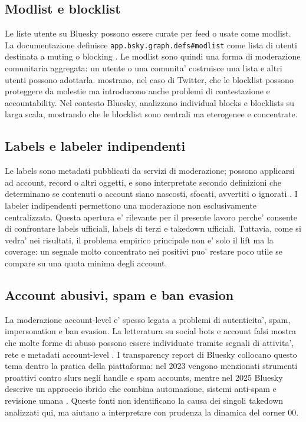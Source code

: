 \subsection{Modlist e blocklist}

Le liste utente su Bluesky possono essere curate per feed o usate come modlist. La documentazione definisce \texttt{app.bsky.graph.defs\#modlist} come lista di utenti destinata a muting o blocking \parencite{blueskyUserLists}. Le modlist sono quindi una forma di moderazione comunitaria aggregata: un utente o una comunita' costruisce una lista e altri utenti possono adottarla. \textcite{jhaver2018blocklists} mostrano, nel caso di Twitter, che le blocklist possono proteggere da molestie ma introducono anche problemi di contestazione e accountability. Nel contesto Bluesky, \textcite{sokoto2026open} analizzano individual blocks e blocklists su larga scala, mostrando che le blocklist sono centrali ma eterogenee e concentrate.

\subsection{Labels e labeler indipendenti}

Le labels sono metadati pubblicati da servizi di moderazione; possono applicarsi ad account, record o altri oggetti, e sono interpretate secondo definizioni che determinano se contenuti o account siano nascosti, sfocati, avvertiti o ignorati \parencite{blueskyLabelsModeration}. I labeler indipendenti permettono una moderazione non esclusivamente centralizzata. Questa apertura e' rilevante per il presente lavoro perche' consente di confrontare labels ufficiali, labels di terzi e takedown ufficiali. Tuttavia, come si vedra' nei risultati, il problema empirico principale non e' solo il lift ma la coverage: un segnale molto concentrato nei positivi puo' restare poco utile se compare su una quota minima degli account.

\subsection{Account abusivi, spam e ban evasion}

La moderazione account-level e' spesso legata a problemi di autenticita', spam, impersonation e ban evasion. La letteratura su social bots e account falsi mostra che molte forme di abuso possono essere individuate tramite segnali di attivita', rete e metadati account-level \parencite{ferrara2016rise, varol2017online, cao2012aiding, stringhini2010detecting}. I transparency report di Bluesky collocano questo tema dentro la pratica della piattaforma: nel 2023 vengono menzionati strumenti proattivi contro slurs negli handle e spam accounts, mentre nel 2025 Bluesky descrive un approccio ibrido che combina automazione, sistemi anti-spam e revisione umana \parencite{bluesky2023moderation, bluesky2025transparency}. Queste fonti non identificano la causa dei singoli takedown analizzati qui, ma aiutano a interpretare con prudenza la dinamica del corner 00.

